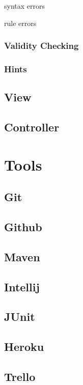 syntax errors

rule errors
\subsubsection{Validity Checking}
\subsubsection{Hints}

\subsection{View}


\subsection{Controller}



\section{Tools}

\subsection{Git}

\subsection{Github}

\subsection{Maven}

\subsection{Intellij}

\subsection{JUnit}

\subsection{Heroku}

\subsection{Trello}




